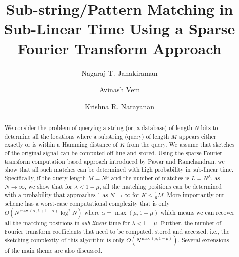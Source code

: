 \documentclass[sigconf]{acmart}
\begin{document}
\title{Sub-string/Pattern Matching in Sub-Linear Time Using a Sparse Fourier Transform Approach}


\author{Nagaraj T. Janakiraman}

\author{Avinash Vem}

\author{Krishna R. Narayanan}


\renewcommand{\shortauthors}{B. Trovato et al.}


\begin{abstract}
	We consider the problem of querying a string (or, a database) of length $N$ bits to determine all the locations where a substring (query) of length $M$ appears either exactly or is within a Hamming distance of $K$ from the query. We assume that sketches of the original signal can be computed off line and stored. Using the sparse Fourier transform computation based approach introduced by Pawar and Ramchandran, we show that all such matches can be determined with high probability in sub-linear time. Specifically, if the query length $M = N^\mu$ and the number of matches is $L=N^\lambda$, as $N \rightarrow \infty$, we show that  for $\lambda < 1-\mu$, all the matching positions can be determined with a probability that approaches 1 as $N \rightarrow \infty$ for $K \leq \frac{1}{6}M$. More importantly our scheme has a worst-case computational complexity that is only $O\left(N^{\max(\alpha,\lambda+1-\alpha)} \log^2 N \right)$ where $\alpha=\max(\mu,1-\mu)$ which means we can recover all the matching positions in {\it sub-linear} time for $\lambda<1-\mu$. Further, the number of Fourier transform coefficients that need to be computed, stored and accessed, i.e., the sketching complexity of this algorithm is only $O\left( N^{\max(\mu,1-\mu)}\right)$. Several extensions of the main theme are also discussed.
\end{abstract}
\end{document}
